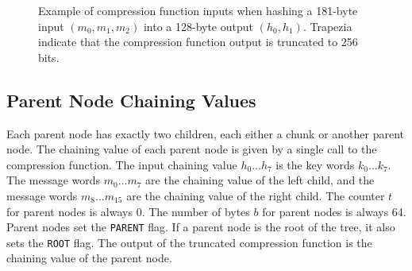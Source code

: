 \documentclass[11pt,notitlepage,a4paper]{article}
\begin{document}
\begin{figure}
\caption{Example of compression function inputs when hashing a 181-byte input $(m_0, m_1, m_2)$ into a 128-byte output $(h_0, h_1)$. Trapezia indicate that the compression function output is truncated to 256 bits.}\label{fig:chunk}
\end{figure}

\subsection{Parent Node Chaining Values}\label{sec:parent}

Each parent node has exactly two children, each either a chunk or another
parent node. The chaining value of each parent node is given by a single call
to the compression function. The input chaining value $h_{0} \ldots h_{7}$ is
the key words $k_{0} \ldots k_{7}$. The message words $m_{0} \ldots m_{7}$ are
the chaining value of the left child, and the message words $m_{8} \ldots
m_{15}$ are the chaining value of the right child. The counter $t$ for parent
nodes is always 0. The number of bytes $b$ for parent nodes is always 64.
Parent nodes set the \texttt{PARENT} flag. If a parent node is the root of the
tree, it also sets the \texttt{ROOT} flag. The output of the truncated
compression function is the chaining value of the parent node.
\end{document}
